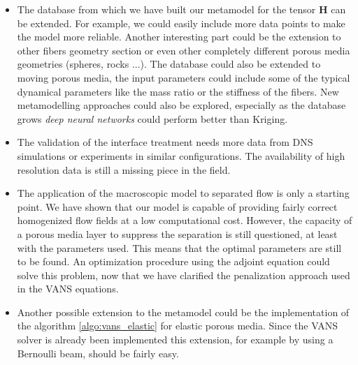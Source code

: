 \begin{itemize}

\item The database from which we have built our metamodel for the tensor $\mathbf{H}$ can be extended. For example, we could easily include more data points to make the model more reliable. Another interesting part could be the extension to other fibers geometry section or even other completely different porous media geometries (spheres, rocks ...). The database could also be extended to moving porous media, the input parameters could include some of the typical dynamical parameters like the mass ratio or the stiffness of the fibers. New metamodelling approaches could also be explored, especially as the database grows \textit{deep neural networks} could perform better than Kriging.

\item The validation of the interface treatment needs more data from DNS simulations or experiments in similar configurations. The availability of high resolution data is still a missing piece in the field.

\item The application of the macroscopic model to separated flow is only a starting point. We have shown that our model is capable of providing fairly correct homogenized flow fields at a low computational cost. However, the capacity of a porous media layer to suppress the separation is still questioned, at least with the parameters used. This means that the optimal parameters are still to be found. An optimization procedure using the adjoint equation could solve this problem, now that we have clarified the penalization approach used in the VANS equations.

\item Another possible extension to the metamodel could be the implementation of the algorithm \ref{algo:vans_elastic} for elastic porous media. Since the VANS solver is already been implemented this extension, for example by using a Bernoulli beam, should be fairly easy.
\end{itemize}
